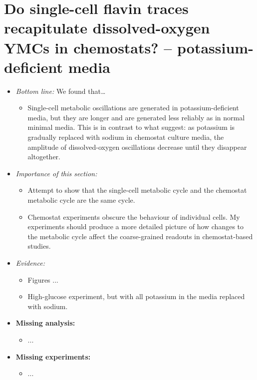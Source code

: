 \section[Potassium-deficient media]{Do single-cell flavin traces recapitulate dissolved-oxygen YMCs in chemostats? -- potassium-deficient media}
\label{sec:biology-potassium_deficient}
\begin{itemize}
\item \emph{Bottom line:} We found that\ldots{}
\begin{itemize}
\item Single-cell metabolic oscillations are generated in potassium-deficient media, but they are longer and are generated less reliably as in normal minimal media.  This is in contrast to what \textcite{oneillEukaryoticCellBiology2020} suggest: as potassium is gradually replaced with sodium in chemostat culture media, the amplitude of dissolved-oxygen oscillations decrease until they disappear altogether.
\end{itemize}
\item \emph{Importance of this section:}
\begin{itemize}
\item Attempt to show that the single-cell metabolic cycle and the chemostat metabolic cycle are the same cycle.
\item Chemostat experiments obscure the behaviour of individual cells.  My experiments should produce a more detailed picture of how changes to the metabolic cycle affect the coarse-grained readouts in chemostat-based studies.
\end{itemize}
\end{itemize}
\begin{itemize}
\item \emph{Evidence:}
\begin{itemize}
\item Figures ...
\item High-glucose experiment, but with all potassium in the media replaced with sodium.
\end{itemize}

\item \textbf{Missing analysis:}
\begin{itemize}
\item ...
\end{itemize}
\item \textbf{Missing experiments:}
\begin{itemize}
\item ...
\end{itemize}
\end{itemize}

